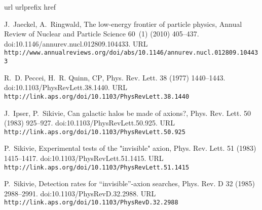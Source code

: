 \documentclass[preprint]{elsarticle}
\begin{document}
\begin{thebibliography}{10}
\expandafter\ifx\csname url\endcsname\relax
  \def\url#1{\texttt{#1}}\fi
\expandafter\ifx\csname urlprefix\endcsname\relax\def\urlprefix{URL }\fi
\expandafter\ifx\csname href\endcsname\relax
  \def\href#1#2{#2} \def\path#1{#1}\fi

J.~Jaeckel, A.~Ringwald,
  \href{http://www.annualreviews.org/doi/abs/10.1146/annurev.nucl.012809.104433}{The
  low-energy frontier of particle physics}, Annual Review of Nuclear and
  Particle Science 60~(1) (2010) 405--437.
\newblock \href {http://dx.doi.org/10.1146/annurev.nucl.012809.104433}
  {\path{doi:10.1146/annurev.nucl.012809.104433}}.
\newline\urlprefix\url{http://www.annualreviews.org/doi/abs/10.1146/annurev.nucl.012809.104433}

R.~D. Peccei, H.~R. Quinn,
  \href{http://link.aps.org/doi/10.1103/PhysRevLett.38.1440}{$\mathrm{CP}$},
  Phys. Rev. Lett. 38 (1977) 1440--1443.
\newblock \href {http://dx.doi.org/10.1103/PhysRevLett.38.1440}
  {\path{doi:10.1103/PhysRevLett.38.1440}}.
\newline\urlprefix\url{http://link.aps.org/doi/10.1103/PhysRevLett.38.1440}

J.~Ipser, P.~Sikivie,
  \href{http://link.aps.org/doi/10.1103/PhysRevLett.50.925}{Can galactic halos
  be made of axions?}, Phys. Rev. Lett. 50 (1983) 925--927.
\newblock \href {http://dx.doi.org/10.1103/PhysRevLett.50.925}
  {\path{doi:10.1103/PhysRevLett.50.925}}.
\newline\urlprefix\url{http://link.aps.org/doi/10.1103/PhysRevLett.50.925}

P.~Sikivie,
  \href{http://link.aps.org/doi/10.1103/PhysRevLett.51.1415}{Experimental tests
  of the "invisible" axion}, Phys. Rev. Lett. 51 (1983) 1415--1417.
\newblock \href {http://dx.doi.org/10.1103/PhysRevLett.51.1415}
  {\path{doi:10.1103/PhysRevLett.51.1415}}.
\newline\urlprefix\url{http://link.aps.org/doi/10.1103/PhysRevLett.51.1415}

P.~Sikivie, \href{http://link.aps.org/doi/10.1103/PhysRevD.32.2988}{Detection
  rates for ``invisible''-axion searches}, Phys. Rev. D 32 (1985) 2988--2991.
\newblock \href {http://dx.doi.org/10.1103/PhysRevD.32.2988}
  {\path{doi:10.1103/PhysRevD.32.2988}}.
\newline\urlprefix\url{http://link.aps.org/doi/10.1103/PhysRevD.32.2988}


\end{thebibliography}
\end{document}
